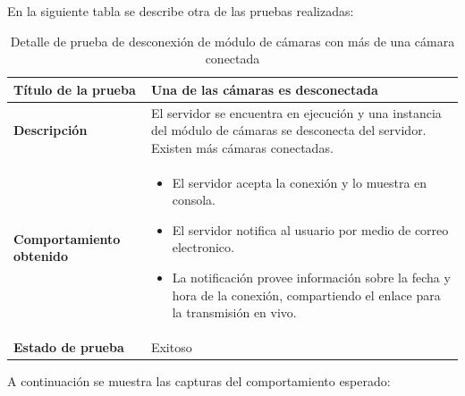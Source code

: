 En la siguiente tabla se describe otra de las pruebas realizadas:\\

\begin{table}[H]
    \caption{Detalle de prueba de desconexión de módulo de cámaras con más de una cámara conectada}
    \begin{center}
        \begin{tabular}{|>{\centering}p{}|m{}<{\centering}|} 
            \hline
            \textbf{Título de la prueba} & Una de las cámaras es desconectada \\
            \hline
            \textbf{Descripción} & El servidor se encuentra en ejecución y una instancia del módulo de cámaras se desconecta del servidor. Existen más cámaras conectadas.\\
            \hline
            \textbf{Comportamiento obtenido} & 
            \begin{itemize}
                \item El servidor acepta la conexión y lo muestra en consola.
                \item El servidor notifica al usuario por medio de correo electronico.
                \item La notificación provee información sobre la fecha y hora de la conexión, compartiendo el enlace para la transmisión en vivo.
            \end{itemize} \\ 
            \hline
            \textbf{Estado de prueba} & Exitoso \\
            \hline
        \end{tabular}
    \end{center}
\end{table}

A continuación se muestra las capturas del comportamiento esperado:

